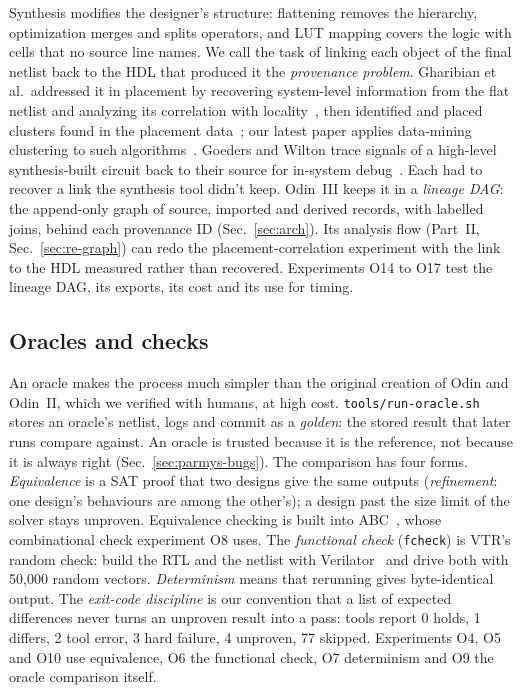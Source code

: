 \documentclass[conference]{IEEEtran}
\newcommand{\code}[1]{\texttt{#1}}
\begin{document}
Synthesis modifies the designer's structure: flattening removes the hierarchy, optimization merges and splits operators, and LUT mapping covers the logic with cells that no source line names. We call the task of linking each object of the final netlist back to the HDL that produced it the \emph{provenance problem}. Gharibian et al.\ addressed it in placement by recovering system-level information from the flat netlist and analyzing its correlation with locality~\cite{gharibian2010finding,gharibian2013analyzing}, then identified and placed clusters found in the placement data~\cite{gharibian2014identifying}; our latest paper applies data-mining clustering to such algorithms~\cite{jamieson2022datamining}. Goeders and Wilton trace signals of a high-level synthesis-built circuit back to their source for in-system debug~\cite{goeders2014effective,goeders2015dynamic,goeders2017signaltracing}. Each had to recover a link the synthesis tool didn't keep. Odin~III keeps it in a \emph{lineage DAG}: the append-only graph of source, imported and derived records, with labelled joins, behind each provenance ID (Sec.~\ref{sec:arch}). %
Its analysis flow (Part~II, Sec.~\ref{sec:re-graph}) can redo the placement-correlation experiment with the link to the HDL measured rather than recovered. Experiments O14 to O17 test the lineage DAG, its exports, its cost and its use for timing.

\subsection{Oracles and checks}

An oracle makes the process much simpler than the original creation of Odin and Odin~II, which we verified with humans, at high cost. \code{tools/run-oracle.sh} stores an oracle's netlist, logs and commit as a \emph{golden}: the stored result that later runs compare against. %
An oracle is trusted because it is the reference, not because it is always right (Sec.~\ref{sec:parmys-bugs}). The comparison has four forms. \emph{Equivalence} is a SAT proof that two designs give the same outputs (\emph{refinement}: one design's behaviours are among the other's); a design past the size limit of the solver stays unproven. %
Equivalence checking is built into ABC~\cite{mishchenko2005fraigs,brayton2010abc}, whose combinational check experiment O8 uses. The \emph{functional check} (\code{fcheck}) is VTR's random check: build the RTL and the netlist with Verilator~\cite{verilator} and drive both with 50,000 random vectors. %
\emph{Determinism} means that rerunning gives byte-identical output. %
The \emph{exit-code discipline} is our convention that a list of expected differences never turns an unproven result into a pass: tools report 0 holds, 1 differs, 2 tool error, 3 hard failure, 4 unproven, 77 skipped. %
Experiments O4, O5 and O10 use equivalence, O6 the functional check, O7 determinism and O9 the oracle comparison itself.
\end{document}
